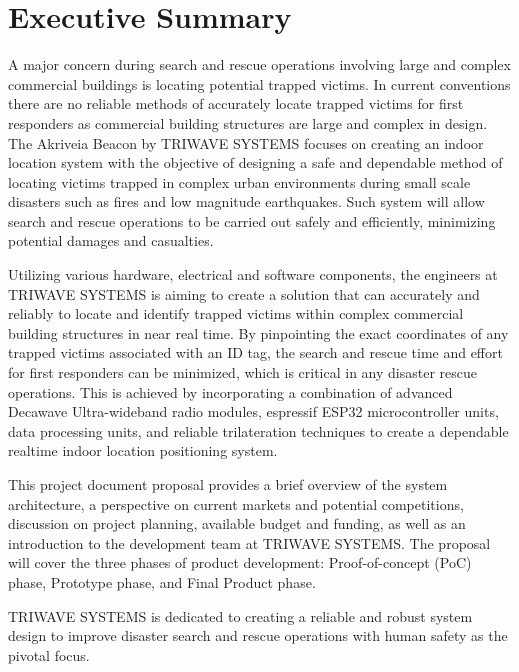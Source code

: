 

\section*{Executive Summary}	%
\bigskip
A major concern during search and rescue operations involving large and complex commercial buildings is locating potential trapped victims. In current conventions there are no reliable methods of accurately locate trapped victims for first responders as commercial building structures are large and complex in design. The Akriveia Beacon by TRIWAVE SYSTEMS focuses on creating an indoor location system with the objective of designing a safe and dependable method of locating victims trapped in complex urban environments during small scale disasters such as fires and low magnitude earthquakes. Such system will allow search and rescue operations to be carried out safely and efficiently, minimizing potential damages and casualties.

\bigskip
Utilizing various hardware, electrical and software components, the engineers at TRIWAVE SYSTEMS is aiming to create a solution that can accurately and reliably to locate and identify trapped victims within complex commercial building structures in near real time. By pinpointing the exact coordinates of any trapped victims associated with an ID tag, the search and rescue time and effort for first responders can be minimized, which is critical in any disaster rescue operations. This is achieved by incorporating a combination of advanced Decawave Ultra-wideband radio modules, espressif ESP32 microcontroller units, data processing units, and reliable trilateration techniques to create a dependable realtime indoor location positioning system.

\bigskip
This project document proposal provides a brief overview of the system architecture, a perspective on current markets and potential competitions, discussion on project planning, available budget and funding, as well as an introduction to the development team at TRIWAVE SYSTEMS. The proposal will cover the three phases of product development: Proof-of-concept (\Gls{PoC}) phase, Prototype phase, and Final Product phase.

\bigskip
TRIWAVE SYSTEMS is dedicated to creating a reliable and robust system design to improve disaster search and rescue operations with human safety as the pivotal focus.
